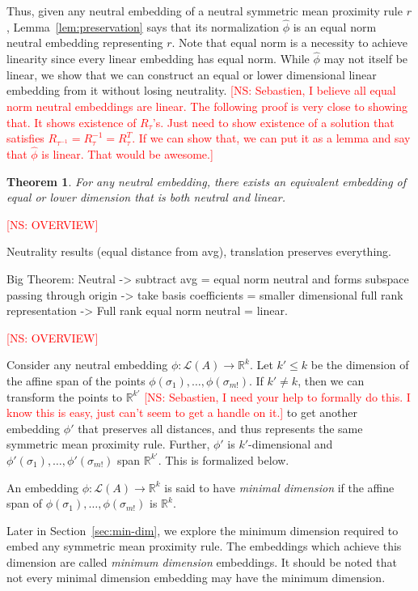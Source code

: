 \documentclass[10pt,letterpaper]{article}
\newcommand{\calL}{{\mathcal{L}}}
\newcommand{\rank}{{\calL(A)}}
\newtheorem{theorem}{Theorem}
\newenvironment{definition}[1][Definition]{\begin{trivlist}
\item[\hskip \labelsep {\bfseries #1}]}{\end{trivlist}}
\newcommand{\kibitz}[2]{\ifnum\Comments=1\textcolor{#1}{#2}\fi}
\newcommand{\cns}[1]{\kibitz{red} {[NS: #1]}}
\begin{document}
Thus, given any neutral embedding of a neutral symmetric mean proximity rule $r$, Lemma~\ref{lem:preservation} says that its normalization $\hat{\phi}$ is an equal norm neutral embedding representing $r$. Note that equal norm is a necessity to achieve linearity since every linear embedding has equal norm. While $\hat{\phi}$ may not itself be linear, we show that we can construct an equal or lower dimensional linear embedding from it without losing neutrality. \cns{Sebastien, I believe all equal norm neutral embeddings are linear. The following proof is very close to showing that. It shows existence of $R_{\tau}$'s. Just need to show existence of a solution that satisfies $R_{\tau^{-1}} = R_{\tau}^{-1} = R_{\tau}^T$. If we can show that, we can put it as a lemma and say that $\hat{\phi}$ is linear. That would be awesome.} 

\begin{theorem}
For any neutral embedding, there exists an equivalent embedding of equal or lower dimension that is both neutral and linear. 
\label{thm:neutral-linear}
\end{theorem}

\cns{OVERVIEW}

Neutrality results (equal distance from avg), translation preserves everything.

Big Theorem:
Neutral -> subtract avg = equal norm neutral and forms subspace passing through origin -> take basis coefficients = smaller dimensional full rank representation -> Full rank equal norm neutral = linear. 


\cns{OVERVIEW}



Consider any neutral embedding $\phi: \rank \rightarrow \mathbb{R}^k$. Let $k' \le k$ be the dimension of the affine span of the points $\phi(\sigma_1),\ldots,\phi(\sigma_{m!})$. If $k' \neq k$, then we can transform the points to $\mathbb{R}^{k'}$ \cns{Sebastien, I need your help to formally do this. I know this is easy, just can't seem to get a handle on it.} to get another embedding $\phi'$ that preserves all distances, and thus represents the same symmetric mean proximity rule. Further, $\phi'$ is $k'$-dimensional and $\phi'(\sigma_1),\ldots,\phi'(\sigma_{m!})$ span $\mathbb{R}^{k'}$. This is formalized below.

\begin{definition}[Minimal Dimension Embedding]
An embedding $\phi: \rank \rightarrow \mathbb{R}^k$ is said to have \emph{minimal dimension} if the affine span of $\phi(\sigma_1),\ldots,\phi(\sigma_{m!})$ is $\mathbb{R}^k$.
\end{definition}
Later in Section~\ref{sec:min-dim}, we explore the minimum dimension required to embed any symmetric mean proximity rule. The embeddings which achieve this dimension are called \emph{minimum dimension} embeddings. It should be noted that not every minimal dimension embedding may have the minimum dimension. 
\end{document}
